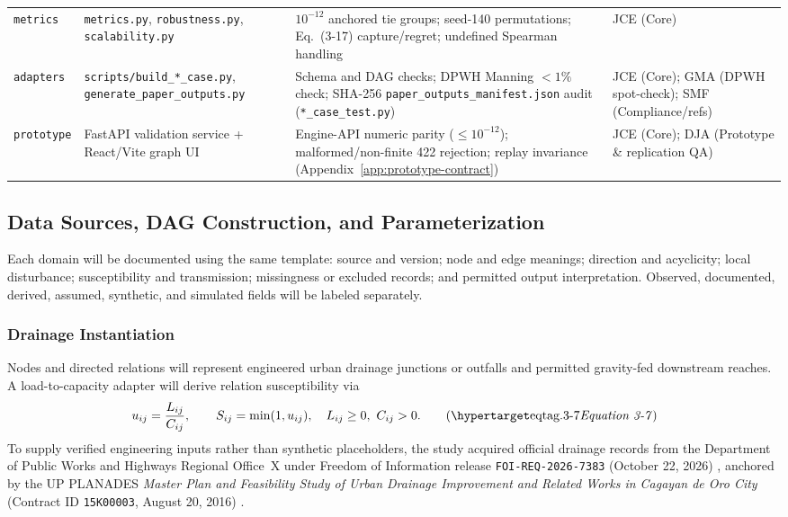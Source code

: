 \begin{table}[htbp]
\begin{tabularx}{\textwidth}{@{}>{\raggedright\arraybackslash}p{2.2cm} >{\raggedright\arraybackslash}p{3.2cm} L >{\raggedright\arraybackslash}p{2.1cm}@{}}
\texttt{metrics} & \texttt{metrics.py}, \texttt{robustness.py}, \texttt{scalability.py} & $10^{-12}$ anchored tie groups; seed-140 permutations; Eq.~(3-17) capture/regret; undefined Spearman handling & JCE (Core)\\
\texttt{adapters} & \texttt{scripts/build\_*\_\allowbreak case.py}, \texttt{generate\_\allowbreak paper\_\allowbreak outputs.py} & Schema and DAG checks; DPWH Manning $<1\%$ check; SHA-256 \texttt{paper\_\allowbreak outputs\_\allowbreak manifest.json} audit (\texttt{*\_\allowbreak case\_\allowbreak test.py}) & JCE (Core); GMA (DPWH spot-check); SMF (Compliance/refs)\\
\texttt{prototype} & FastAPI validation service + React/Vite graph UI & Engine-API numeric parity ($\le 10^{-12}$); malformed/non-finite 422 rejection; replay invariance (Appendix~\ref{app:prototype-contract}) & JCE (Core); DJA (Prototype \& replication QA)\\
\bottomrule
\end{tabularx}
\end{table}

\subsection{Data Sources, DAG Construction, and Parameterization}
\label{domain-parameterization}

Each domain will be documented using the same template: source and version;
node and edge meanings; direction and acyclicity; local disturbance;
susceptibility and transmission; missingness or excluded records; and
permitted output interpretation. Observed, documented, derived, assumed,
synthetic, and simulated fields will be labeled separately.

\subsubsection{Drainage Instantiation}

Nodes and directed relations will represent engineered urban drainage
junctions or outfalls and permitted gravity-fed downstream reaches. A
load-to-capacity adapter will derive relation susceptibility via
\[
u_{ij}=\frac{L_{ij}}{C_{ij}},\qquad S_{ij}=\min(1,u_{ij}),
\quad L_{ij}\ge0,\ C_{ij}>0.
\eqtag{3-7}
\]
To supply verified engineering inputs rather than synthetic placeholders, the
study acquired official drainage records from the Department of Public Works
and Highways Regional Office~X under Freedom of Information release
\texttt{FOI-REQ-2026-7383} (October 22, 2026) \citep{dpwh2026foi}, anchored
by the UP PLANADES \emph{Master Plan and Feasibility Study of Urban Drainage
Improvement and Related Works in Cagayan de Oro City} (Contract ID
\texttt{15K00003}, August 20, 2016) \citep{upplanades2016}.

